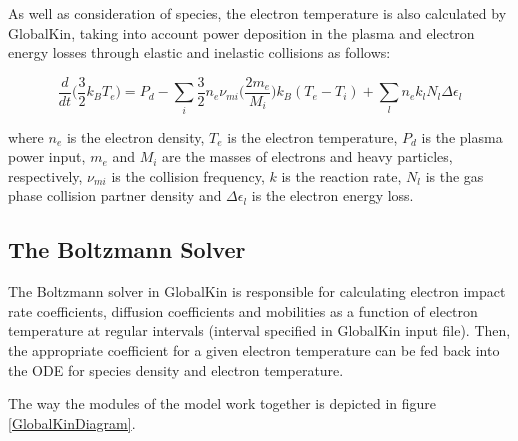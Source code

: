 \documentclass[11pt, oneside]{article}   	%
\begin{document}
As well as consideration of species, the electron temperature is also calculated by GlobalKin, taking into account power deposition in the plasma and electron energy losses through elastic and inelastic collisions as follows:

\begin{equation}
\frac{d}{dt}\Big(\frac{3}{2}k_BT_e\Big) = P_d - \sum_i\frac{3}{2}n_e\nu_{mi}\Big(\frac{2m_e}{M_i}\Big)k_B(T_e - T_i) + \sum_l n_ek_lN_l\Delta\epsilon_l
\label{ElectronTempEqn}
\end{equation}

where $n_e$ is the electron density, $T_e$ is the electron temperature, $P_d$ is the plasma power input, $m_e$ and $M_i$ are the masses of electrons and heavy particles, respectively, $\nu_{mi}$ is the collision frequency, $k$ is the reaction rate, $N_l$ is the gas phase collision partner density and $\Delta\epsilon_l$ is the electron energy loss.

\subsection{The Boltzmann Solver}


The Boltzmann solver in GlobalKin is responsible for calculating electron impact rate coefficients, diffusion coefficients and mobilities as a function of electron temperature at regular intervals (interval specified in GlobalKin input file).
Then, the appropriate coefficient for a given electron temperature can be fed back into the ODE for species density and electron temperature.

The way the modules of the model work together is depicted in figure \ref{GlobalKinDiagram}.
\end{document}
